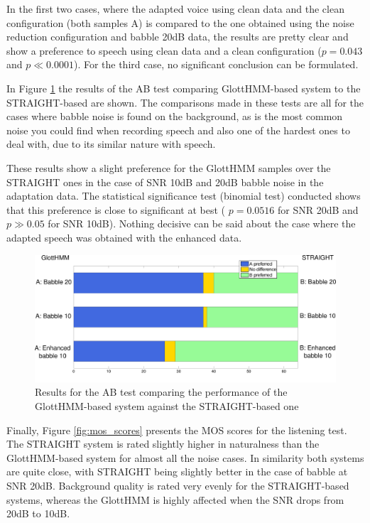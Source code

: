In the first two cases, where the adapted voice using clean data and the clean configuration (both samples A) is compared to the one obtained using the noise reduction configuration and babble 20dB data, the results are pretty clear and show a preference to speech using clean data and a clean configuration ($p = 0.043$ and $p \ll 0.0001$).
%
For the third case, no significant conclusion can be formulated.

In Figure \ref{fig:glott_vs_st} the results of the AB test comparing GlottHMM-based system to the STRAIGHT-based are shown.
%
The comparisons made in these tests are all for the cases where babble noise is found on the background, as is the most common noise you could find when recording speech and also one of the hardest ones to deal with, due to its similar nature with speech.

These results show a slight preference for the GlottHMM samples over the STRAIGHT ones in the case of SNR 10dB and 20dB babble noise in the adaptation data.
%
The statistical significance test (binomial test) conducted shows that this preference is close to significant at best ( $p = 0.0516$ for SNR 20dB and $p \gg 0.05$ for SNR 10dB).
%
Nothing decisive can be said about the case where the adapted speech was obtained with the enhanced data.

\begin{figure}[!htb]
  \begin{centering}
  \includegraphics[width=\textwidth]{images/glott_vs_st.pdf}
  \caption{Results for the AB test comparing the performance of the GlottHMM-based system against the STRAIGHT-based one}
  \label{fig:glott_vs_st}
  \end{centering}
\end{figure}

Finally, Figure \ref{fig:mos_scores} presents the MOS scores for the listening test.
%
The STRAIGHT system is rated slightly higher in naturalness than the GlottHMM-based system for almost all the noise cases.
%
In similarity both systems are quite close, with STRAIGHT being slightly better in the case of babble at SNR 20dB.
%
Background quality is rated very evenly for the STRAIGHT-based systems, whereas the GlottHMM is highly affected when the SNR drops from 20dB to 10dB.


